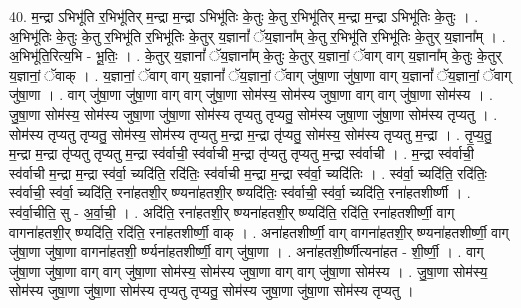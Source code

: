 \documentclass[17pt]{extarticle}
\begin{document}
40. म॒न्द्रा ऽभिभू॑ति र॒भिभू॑तिर् म॒न्द्रा म॒न्द्रा ऽभिभू॑तिः के॒तुः के॒तु र॒भिभू॑तिर् म॒न्द्रा म॒न्द्रा ऽभिभू॑तिः के॒तुः । . अ॒भिभू॑तिः के॒तुः के॒तु र॒भिभू॑ति र॒भिभू॑तिः के॒तुर् य॒ज्ञानां᳚ ॅय॒ज्ञाना᳚म् के॒तु र॒भिभू॑ति र॒भिभू॑तिः के॒तुर् य॒ज्ञाना᳚म् । . अ॒भिभू॑ति॒रित्य॒भि - भू॒तिः॒ । . के॒तुर् य॒ज्ञानां᳚ ॅय॒ज्ञाना᳚म् के॒तुः के॒तुर् य॒ज्ञानां॒ ॅवाग् वाग् य॒ज्ञाना᳚म् के॒तुः के॒तुर् य॒ज्ञानां॒ ॅवाक् । . य॒ज्ञानां॒ ॅवाग् वाग् य॒ज्ञानां᳚ ॅय॒ज्ञानां॒ ॅवाग् जु॑षा॒णा जु॑षा॒णा वाग् य॒ज्ञानां᳚ ॅय॒ज्ञानां॒ ॅवाग् जु॑षा॒णा । . वाग् जु॑षा॒णा जु॑षा॒णा वाग् वाग् जु॑षा॒णा सोम॑स्य॒ सोम॑स्य जुषा॒णा वाग् वाग् जु॑षा॒णा सोम॑स्य । . जु॒षा॒णा सोम॑स्य॒ सोम॑स्य जुषा॒णा जु॑षा॒णा सोम॑स्य तृप्यतु तृप्यतु॒ सोम॑स्य जुषा॒णा जु॑षा॒णा सोम॑स्य तृप्यतु । . सोम॑स्य तृप्यतु तृप्यतु॒ सोम॑स्य॒ सोम॑स्य तृप्यतु म॒न्द्रा म॒न्द्रा तृ॑प्यतु॒ सोम॑स्य॒ सोम॑स्य तृप्यतु म॒न्द्रा । . तृ॒प्य॒तु॒ म॒न्द्रा म॒न्द्रा तृ॑प्यतु तृप्यतु म॒न्द्रा स्व॑र्वाची॒ स्व॑र्वाची म॒न्द्रा तृ॑प्यतु तृप्यतु म॒न्द्रा स्व॑र्वाची । . म॒न्द्रा स्व॑र्वाची॒ स्व॑र्वाची म॒न्द्रा म॒न्द्रा स्व॑र्वा॒ च्यदि॑ति॒ रदि॑तिः॒ स्व॑र्वाची म॒न्द्रा म॒न्द्रा स्व॑र्वा॒ च्यदि॑तिः । . स्व॑र्वा॒ च्यदि॑ति॒ रदि॑तिः॒ स्व॑र्वाची॒ स्व॑र्वा॒ च्यदि॑ति॒ रना॑हतशी॒र् ष्ण्यना॑हतशी॒र् ष्ण्यदि॑तिः॒ स्व॑र्वाची॒ स्व॑र्वा॒ च्यदि॑ति॒ रना॑हतशीर्ष्णी । . स्व॑र्वा॒चीति॒ सु - अ॒र्वा॒ची॒ । . अदि॑ति॒ रना॑हतशी॒र् ष्ण्यना॑हतशी॒र् ष्ण्यदि॑ति॒ रदि॑ति॒ रना॑हतशीर्ष्णी॒ वाग् वागना॑हतशी॒र् ष्ण्यदि॑ति॒ रदि॑ति॒ रना॑हतशीर्ष्णी॒ वाक् । . अना॑हतशीर्ष्णी॒ वाग् वागना॑हतशी॒र्‌ ष्ण्यना॑हतशीर्ष्णी॒ वाग् जु॑षा॒णा जु॑षा॒णा वागना॑हतशी॒ र्ष्ण्यना॑हतशीर्ष्णी॒ वाग् जु॑षा॒णा । . अना॑हतशी॒र्ष्णीत्यना॑हत - शी॒र्ष्णी॒ । . वाग् जु॑षा॒णा जु॑षा॒णा वाग् वाग् जु॑षा॒णा सोम॑स्य॒ सोम॑स्य जुषा॒णा वाग् वाग् जु॑षा॒णा सोम॑स्य । . जु॒षा॒णा सोम॑स्य॒ सोम॑स्य जुषा॒णा जु॑षा॒णा सोम॑स्य तृप्यतु तृप्यतु॒ सोम॑स्य जुषा॒णा जु॑षा॒णा सोम॑स्य तृप्यतु । \newline
\end{document}
